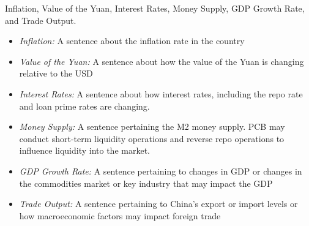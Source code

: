  Inflation, Value of the Yuan, Interest Rates, Money Supply, GDP Growth Rate, and Trade Output.
\begin{itemize}
    \item \textit{Inflation: }A sentence about the inflation rate in the country
    \item \textit{Value of the Yuan: }A sentence about how the value of the Yuan is changing relative to the USD 
    \item \textit{Interest Rates: }A sentence about how interest rates, including the repo rate and loan prime rates are changing. 
    \item \textit{Money Supply: }A sentence pertaining the M2 money supply. PCB may conduct short-term liquidity operations and reverse repo operations to influence liquidity into the market.
    \item \textit{GDP Growth Rate: }A sentence pertaining to changes in GDP or changes in the commodities market or key industry that may impact the GDP
    \item \textit{Trade Output: }A sentence pertaining to China's export or import levels or how macroeconomic factors   may impact foreign trade 
\end{itemize}

